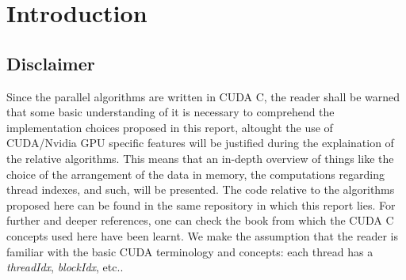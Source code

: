 \documentclass[12pt]{extarticle}
\begin{document}
{
  \hypersetup{linkcolor=black}
  \tableofcontents
}

\section{Introduction}
\subsection{Disclaimer}
Since the parallel algorithms are written in CUDA C, the reader shall be warned that some basic understanding of it is necessary to comprehend the implementation choices proposed in this report, altought the use of CUDA/Nvidia GPU specific features will be justified during the explaination of the relative algorithms. This means that an in-depth overview of things like the choice of the arrangement of the data in memory, the computations regarding thread indexes, and such, will be presented.\newline
The code relative to the algorithms proposed here can be found in the same repository in which this report lies\cite{website:repo}.
For further and deeper references, one can check the book\cite{cuda_c_programming:textbook} from which the CUDA C concepts used here have been learnt. We make the assumption that the reader is familiar with the basic CUDA terminology and concepts: each thread has a \emph{threadIdx}, \emph{blockIdx}, etc..
\end{document}
